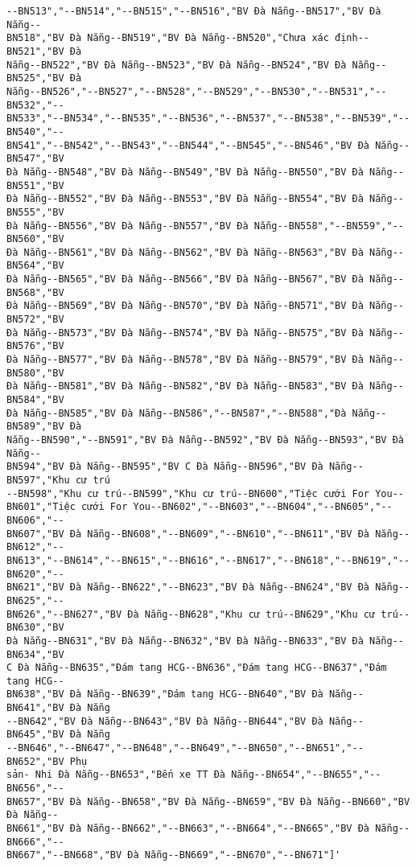 \documentclass[11pt]{article}
\begin{document}
\begin{tcolorbox}[breakable, size=fbox, boxrule=.5pt, pad at break*=1mm, opacityfill=0]
\begin{Verbatim}[commandchars=\\\{\}]
--BN513","--BN514","--BN515","--BN516","BV Đà Nẵng--BN517","BV Đà Nẵng--
BN518","BV Đà Nẵng--BN519","BV Đà Nẵng--BN520","Chưa xác định--BN521","BV Đà
Nẵng--BN522","BV Đà Nẵng--BN523","BV Đà Nẵng--BN524","BV Đà Nẵng--BN525","BV Đà
Nẵng--BN526","--BN527","--BN528","--BN529","--BN530","--BN531","--BN532","--
BN533","--BN534","--BN535","--BN536","--BN537","--BN538","--BN539","--BN540","--
BN541","--BN542","--BN543","--BN544","--BN545","--BN546","BV Đà Nẵng--BN547","BV
Đà Nẵng--BN548","BV Đà Nẵng--BN549","BV Đà Nẵng--BN550","BV Đà Nẵng--BN551","BV
Đà Nẵng--BN552","BV Đà Nẵng--BN553","BV Đà Nẵng--BN554","BV Đà Nẵng--BN555","BV
Đà Nẵng--BN556","BV Đà Nẵng--BN557","BV Đà Nẵng--BN558","--BN559","--BN560","BV
Đà Nẵng--BN561","BV Đà Nẵng--BN562","BV Đà Nẵng--BN563","BV Đà Nẵng--BN564","BV
Đà Nẵng--BN565","BV Đà Nẵng--BN566","BV Đà Nẵng--BN567","BV Đà Nẵng--BN568","BV
Đà Nẵng--BN569","BV Đà Nẵng--BN570","BV Đà Nẵng--BN571","BV Đà Nẵng--BN572","BV
Đà Nẵng--BN573","BV Đà Nẵng--BN574","BV Đà Nẵng--BN575","BV Đà Nẵng--BN576","BV
Đà Nẵng--BN577","BV Đà Nẵng--BN578","BV Đà Nẵng--BN579","BV Đà Nẵng--BN580","BV
Đà Nẵng--BN581","BV Đà Nẵng--BN582","BV Đà Nẵng--BN583","BV Đà Nẵng--BN584","BV
Đà Nẵng--BN585","BV Đà Nẵng--BN586","--BN587","--BN588","Đà Nẵng--BN589","BV Đà
Nẵng--BN590","--BN591","BV Đà Nẵng--BN592","BV Đà Nẵng--BN593","BV Đà Nẵng--
BN594","BV Đà Nẵng--BN595","BV C Đà Nẵng--BN596","BV Đà Nẵng--BN597","Khu cư trú
--BN598","Khu cư trú--BN599","Khu cư trú--BN600","Tiệc cưới For You--
BN601","Tiệc cưới For You--BN602","--BN603","--BN604","--BN605","--BN606","--
BN607","BV Đà Nẵng--BN608","--BN609","--BN610","--BN611","BV Đà Nẵng--BN612","--
BN613","--BN614","--BN615","--BN616","--BN617","--BN618","--BN619","--BN620","--
BN621","BV Đà Nẵng--BN622","--BN623","BV Đà Nẵng--BN624","BV Đà Nẵng--BN625","--
BN626","--BN627","BV Đà Nẵng--BN628","Khu cư trú--BN629","Khu cư trú--BN630","BV
Đà Nẵng--BN631","BV Đà Nẵng--BN632","BV Đà Nẵng--BN633","BV Đà Nẵng--BN634","BV
C Đà Nẵng--BN635","Đám tang HCG--BN636","Đám tang HCG--BN637","Đám tang HCG--
BN638","BV Đà Nẵng--BN639","Đám tang HCG--BN640","BV Đà Nẵng--BN641","BV Đà Nẵng
--BN642","BV Đà Nẵng--BN643","BV Đà Nẵng--BN644","BV Đà Nẵng--BN645","BV Đà Nẵng
--BN646","--BN647","--BN648","--BN649","--BN650","--BN651","--BN652","BV Phụ
sản- Nhi Đà Nẵng--BN653","Bến xe TT Đà Nẵng--BN654","--BN655","--BN656","--
BN657","BV Đà Nẵng--BN658","BV Đà Nẵng--BN659","BV Đà Nẵng--BN660","BV Đà Nẵng--
BN661","BV Đà Nẵng--BN662","--BN663","--BN664","--BN665","BV Đà Nẵng--BN666","--
BN667","--BN668","BV Đà Nẵng--BN669","--BN670","--BN671"]'
\end{Verbatim}
\end{tcolorbox}
        
\end{document}
